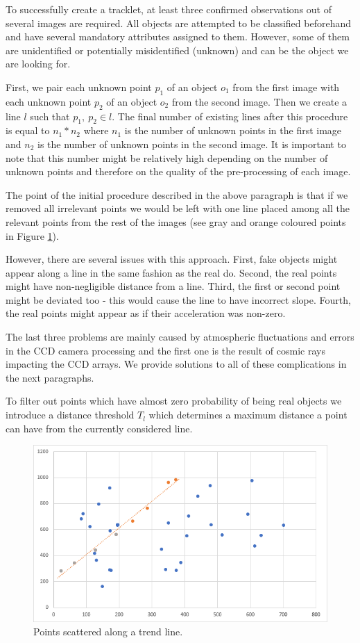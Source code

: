 	To successfully create a tracklet, at least three confirmed observations out of several images are required. All objects are attempted to be classified beforehand and have several mandatory attributes assigned to them. However, some of them are unidentified or potentially misidentified (unknown) and can be the object we are looking for. 
	
	First, we pair each unknown point $p_1$ of an object $o_1$ from the first image with each unknown point $p_2$ of an object $o_2$ from the second image. Then we create a line $l$ such that $p_1,\ p_2 \in l$. The final number of existing lines after this procedure is equal to $n_1 * n_2$ where $n_1$ is the number of unknown points in the first image and $n_2$ is the number of unknown points in the second image. It is important to note that this number might be relatively high depending on the number of unknown points and therefore on the quality of the pre-processing of each image. 
	
	The point of the initial procedure described in the above paragraph is that if we removed all irrelevant points we would be left with one line placed among all the relevant points from the rest of the images (see gray and orange coloured points in Figure \ref{fig:regresia1}).
	
	However, there are several issues with this approach. First, fake objects might appear along a line in the same fashion as the real do. Second, the real points might have non-negligible distance from a line. Third, the first or second point might be deviated too - this would cause the line to have incorrect slope. Fourth, the real points might appear as if their acceleration was non-zero. 
	
	The last three problems are mainly caused by atmospheric fluctuations and errors in the CCD camera processing and the first one is the result of cosmic rays impacting the CCD arrays. We provide solutions to all of these complications in the next paragraphs.
	
	 To filter out points which have almost zero probability of being real objects we introduce a distance threshold $T_l$ which determines a maximum distance a point can have from the currently considered line. 
	
	\begin{figure}[H]
	\centering
	  \includegraphics[width=12cm]{images/regresia1}
		  \caption{Points scattered along a trend line.}
	  \label{fig:regresia1}
	\end{figure}
	
